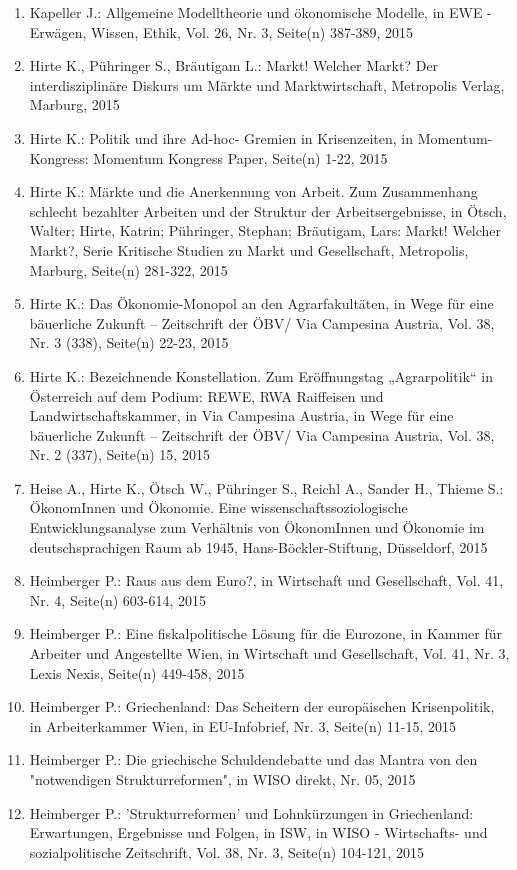 \begin{enumerate}
	 \item Kapeller J.: Allgemeine Modelltheorie und ökonomische Modelle, in EWE - Erwägen, Wissen, Ethik, Vol. 26, Nr. 3, Seite(n) 387-389, 2015
	 \item Hirte K., Pühringer S., Bräutigam L.: Markt! Welcher Markt? Der interdisziplinäre Diskurs um Märkte und Marktwirtschaft, Metropolis Verlag, Marburg, 2015
	 \item Hirte K.: Politik und ihre Ad-hoc- Gremien in Krisenzeiten, in Momentum-Kongress: Momentum Kongress Paper, Seite(n) 1-22, 2015
	 \item Hirte K.: Märkte und die Anerkennung von Arbeit. Zum Zusammenhang schlecht bezahlter Arbeiten und der Struktur der Arbeitsergebnisse, in Ötsch, Walter; Hirte, Katrin; Pühringer, Stephan; Bräutigam, Lars: Markt! Welcher Markt?, Serie Kritische Studien zu Markt und Gesellschaft, Metropolis, Marburg, Seite(n) 281-322, 2015
	 \item Hirte K.: Das Ökonomie-Monopol an den Agrarfakultäten, in Wege für eine bäuerliche Zukunft – Zeitschrift der ÖBV/ Via Campesina Austria, Vol. 38, Nr. 3 (338), Seite(n) 22-23, 2015
	 \item Hirte K.: Bezeichnende Konstellation. Zum Eröffnungstag „Agrarpolitik“ in Österreich auf dem Podium: REWE, RWA Raiffeisen und Landwirtschaftskammer, in Via Campesina Austria, in Wege für eine bäuerliche Zukunft – Zeitschrift der ÖBV/ Via Campesina Austria, Vol. 38, Nr. 2 (337), Seite(n) 15, 2015
	 \item Heise A., Hirte K., Ötsch W., Pühringer S., Reichl A., Sander H., Thieme S.: ÖkonomInnen und Ökonomie. Eine wissenschaftssoziologische Entwicklungsanalyse zum Verhältnis von ÖkonomInnen und Ökonomie im deutschsprachigen Raum ab 1945, Hans-Böckler-Stiftung, Düsseldorf, 2015
	 \item Heimberger P.: Raus aus dem Euro?, in Wirtschaft und Gesellschaft, Vol. 41, Nr. 4, Seite(n) 603-614, 2015
	 \item Heimberger P.: Eine fiskalpolitische Lösung für die Eurozone, in Kammer für Arbeiter und Angestellte Wien, in Wirtschaft und Gesellschaft, Vol. 41, Nr. 3, Lexis Nexis, Seite(n) 449-458, 2015
	 \item Heimberger P.: Griechenland: Das Scheitern der europäischen Krisenpolitik, in Arbeiterkammer Wien, in EU-Infobrief, Nr. 3, Seite(n) 11-15, 2015
	 \item Heimberger P.: Die griechische Schuldendebatte und das Mantra von den "notwendigen Strukturreformen", in WISO direkt, Nr. 05, 2015
	 \item Heimberger P.: 'Strukturreformen' und Lohnkürzungen in Griechenland: Erwartungen, Ergebnisse und Folgen, in ISW, in WISO - Wirtschafts- und sozialpolitische Zeitschrift, Vol. 38, Nr. 3, Seite(n) 104-121, 2015

\end{enumerate}
